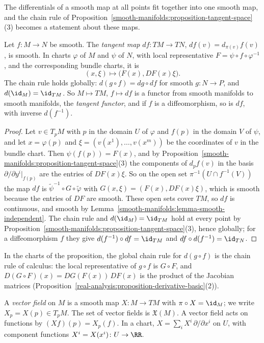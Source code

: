 The differentials of a smooth map at all points fit together into one smooth map, and the chain rule of
Proposition~\ref{smooth-manifolds:proposition-tangent-space}(3) becomes a statement about these maps.

\begin{proposition}\label{smooth-manifolds:proposition-tangent-map}
Let $f \colon M \to N$ be smooth. The \emph{tangent map} $df \colon TM \to TN$, $df(v) = d_{\pi(v)}f(v)$, is smooth. In charts $\varphi$ of $M$ and $\psi$ of $N$,
with local representative $F = \psi \circ f \circ \varphi^{-1}$, and the corresponding bundle charts, it is
\[
(x, \xi) \mapsto \bigl(F(x), DF(x)\xi\bigr).
\]
The chain rule holds globally: $d(g \circ f) = dg \circ df$ for smooth $g \colon N \to P$, and $d(\id_M) = \id_{TM}$. So $M \mapsto TM$, $f \mapsto df$ is a functor
from smooth manifolds to smooth manifolds, the \emph{tangent functor}, and if $f$ is a diffeomorphism, so is $df$, with inverse $d(f^{-1})$.
\end{proposition}

\begin{proof}
Let $v \in T_pM$ with $p$ in the domain $U$ of $\varphi$ and $f(p)$ in the domain $V$ of $\psi$, and let $x = \varphi(p)$ and $\xi = (v(x^1), \ldots, v(x^m))$ be the
coordinates of $v$ in the bundle chart. Then $\psi(f(p)) = F(x)$, and by Proposition~\ref{smooth-manifolds:proposition-tangent-space}(3) the components of
$d_pf(v)$ in the basis $\partial/\partial y^i|_{f(p)}$ are the entries of $DF(x)\xi$. So on the open set $\pi^{-1}(U \cap f^{-1}(V))$ the map $df$ is
$\widetilde{\psi}^{-1} \circ G \circ \widetilde{\varphi}$ with $G(x, \xi) = (F(x), DF(x)\xi)$, which is smooth because the entries of $DF$ are smooth. These open
sets cover $TM$, so $df$ is continuous, and smooth by Lemma~\ref{smooth-manifolds:lemma-smooth-independent}. The chain rule and $d(\id_M) = \id_{TM}$ hold at
every point by Proposition~\ref{smooth-manifolds:proposition-tangent-space}(3), hence globally; for a diffeomorphism $f$ they give
$d(f^{-1}) \circ df = \id_{TM}$ and $df \circ d(f^{-1}) = \id_{TN}$.
\end{proof}

In the charts of the proposition, the global chain rule for $d(g \circ f)$ is the chain rule of calculus: the local representative of $g \circ f$ is $G \circ F$, and
$D(G \circ F)(x) = DG(F(x))\,DF(x)$ is the product of the Jacobian matrices (Proposition~\ref{real-analysis:proposition-derivative-basic}(2)).

\begin{definition}\label{smooth-manifolds:definition-vector-field}
A \emph{vector field} on $M$ is a smooth map $X \colon M \to TM$ with $\pi \circ X = \id_M$; we write $X_p = X(p) \in T_pM$. The set of vector fields is
$\mathfrak{X}(M)$. A vector field acts on functions by $(Xf)(p) = X_p(f)$. In a chart, $X = \sum_iX^i\,\partial/\partial x^i$ on $U$, with component functions
$X^i = X(x^i) \colon U \to \RR$.
\end{definition}


